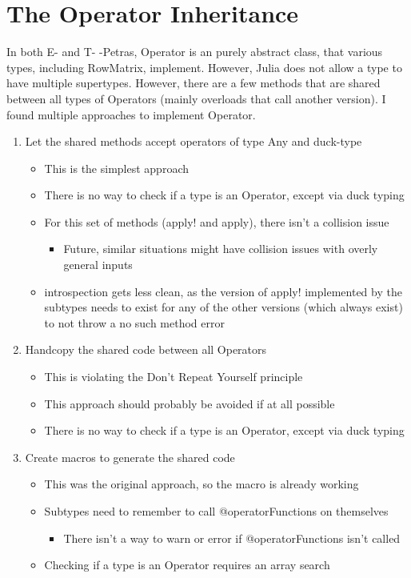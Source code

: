 \documentclass{article}
\begin{document}
\section{The Operator Inheritance}
In both E- and T- -Petras, Operator is an purely abstract class, that various types, including RowMatrix, implement.  However, Julia does not allow a type to have multiple supertypes.  However, there are a few methods that are shared between all types of Operators (mainly overloads that call another version).  I found multiple approaches to implement Operator.
\begin{enumerate}
	\item Let the shared methods accept operators of type Any and duck-type
	\begin{itemize}
		\item This is the simplest approach
		\item There is no way to check if a type is an Operator, except via duck typing
		\item For this set of methods (apply! and apply), there isn't a collision issue
		\begin{itemize}
			\item Future, similar situations might have collision issues with overly general inputs
		\end{itemize}
		\item introspection gets less clean, as the version of apply! implemented by the subtypes needs to exist for any of the other versions (which always exist) to not throw a no such method error
	\end{itemize}

	\item Handcopy the shared code between all Operators
	\begin{itemize}
		\item This is violating the Don't Repeat Yourself principle
		\item This approach should probably be avoided if at all possible
		\item There is no way to check if a type is an Operator, except via duck typing
	\end{itemize}
	
	\item Create macros to generate the shared code
	\begin{itemize}
		\item This was the original approach, so the macro is already working
		\item Subtypes need to remember to call @operatorFunctions on themselves
		\begin{itemize}
			\item There isn't a way to warn or error if @operatorFunctions isn't called
		\end{itemize}
		\item Checking if a type is an Operator requires an array search
	\end{itemize}
	

\end{enumerate}
\end{document}
